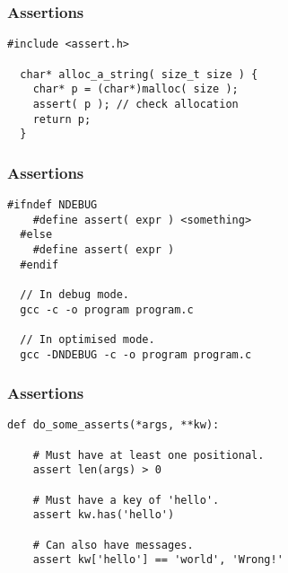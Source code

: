 \begin{frame}[fragile]
  \frametitle{Assertions}
  \begin{example}
    \begin{lstlisting}[style=C]
  #include <assert.h>

  char* alloc_a_string( size_t size ) {
    char* p = (char*)malloc( size );
    assert( p ); // check allocation
    return p;
  }
    \end{lstlisting}
  \end{example}
  \vspace{1cm}
\end{frame}

\begin{frame}[fragile]
  \frametitle{Assertions}
  \begin{example}
    \begin{lstlisting}[style=C]
  #ifndef NDEBUG
    #define assert( expr ) <something>
  #else
    #define assert( expr )
  #endif

  // In debug mode.
  gcc -c -o program program.c

  // In optimised mode.
  gcc -DNDEBUG -c -o program program.c
    \end{lstlisting}
  \end{example}
\end{frame}

\begin{frame}[fragile]
  \frametitle{Assertions}
  \begin{example}
    \begin{lstlisting}[style=Py]
  def do_some_asserts(*args, **kw):

    # Must have at least one positional.
    assert len(args) > 0

    # Must have a key of 'hello'.
    assert kw.has('hello')

    # Can also have messages.
    assert kw['hello'] == 'world', 'Wrong!'
    
    \end{lstlisting}
  \end{example}
\end{frame}
